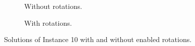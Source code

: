 \documentclass[a4paper, 12pt]{article}
\begin{document}
\begin{figure}
    \centering
    \begin{subfigure}[t]{0.45\textwidth}
        \centering
        \caption{Without rotations.}
    \end{subfigure}
    \hfill
    \begin{subfigure}[t]{0.45\textwidth}  
        \centering 
        \caption{With rotations.}
    \end{subfigure}
    \caption[Solutions with and without rotations.]{Solutions of Instance 10 with and without enabled rotations.}
    \label{fig:rotations}  
\end{figure}
\end{document}
